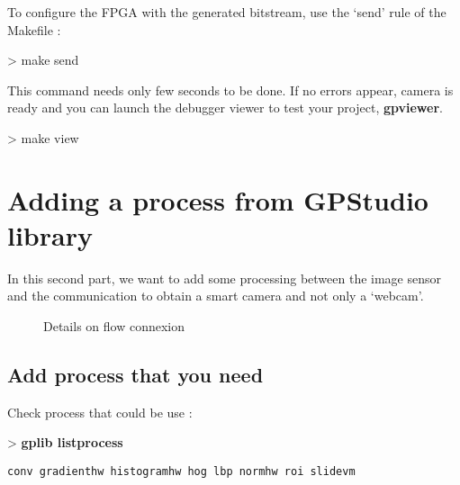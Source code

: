 \documentclass[10pt,a4paper]{article}
\begin{document}
To configure the FPGA with the generated bitstream, use the `send' rule of the Makefile :

\begin{sample}
> make send
\end{sample}

This command needs only few seconds to be done. If no errors appear, camera is ready and you can launch the debugger viewer to test your project, \textbf{gpviewer}.

\begin{sample}
> make view
\end{sample}

\section{Adding a process from GPStudio library}
In this second part, we want to add some processing between the image sensor and the communication to obtain a smart camera and not only a `webcam'.

\begin{figure}[h!]
\centering
{}
\caption{Details on flow connexion}
\end{figure}

\subsection{Add process that you need}
Check process that could be use :

\begin{sample}
> \textbf{gplib listprocess}
\begin{Verbatim}
conv gradienthw histogramhw hog lbp normhw roi slidevm
\end{Verbatim}
\end{sample}
\end{document}
